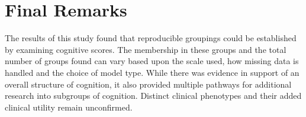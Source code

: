 \section{Final Remarks}

The results of this study found that reproducible groupings could be established by examining cognitive scores. The membership in these groups and the total number of groups found can vary based upon the scale used, how missing data is handled and the choice of model type. While there was evidence in support of an overall structure of cognition, it also provided multiple pathways for additional research into subgroups of cognition. Distinct clinical phenotypes and their added clinical utility remain unconfirmed.
